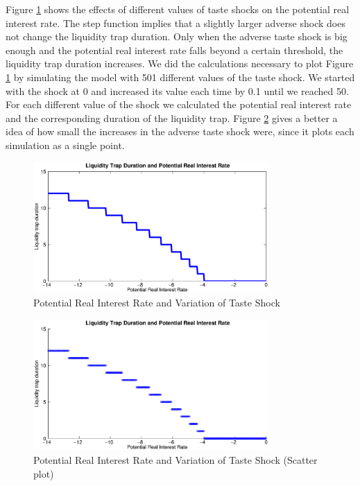 \documentclass[12pt,a4paper,oneside,titlepage]{article}
\begin{document}
\par
\bigskip
Figure \ref{Figure1b} shows the effects of different values of taste shocks on the potential real interest rate. The step function implies that a slightly larger adverse shock does not change the liquidity trap duration. Only when the adverse taste shock is big enough and the potential real interest rate falls beyond a certain threshold, the liquidity trap duration increases. We did the calculations necessary to plot Figure \ref{Figure1b} by simulating the model with 501 different values of the taste shock. We started with the shock at 0 and increased its value each time by 0.1 until we reached 50. For each different value of the shock we calculated the potential real interest rate and the corresponding duration of the liquidity trap. Figure \ref{Figure1bscatter} gives a better a idea of how small the increases in the adverse taste shock were, since it plots each simulation as a single point.

\begin{figure}[!th]
\centering
\includegraphics[width=0.8\textwidth]{Paperpics/Figure1b}
\caption{Potential Real Interest Rate and Variation of Taste Shock}
\label{Figure1b}
\end{figure}


\begin{figure}[!th]
\centering
\includegraphics[width=0.8\textwidth]{Paperpics/Figure1bscatter}
\caption{Potential Real Interest Rate and Variation of Taste Shock (Scatter plot)}
\label{Figure1bscatter}
\end{figure}
\end{document}
